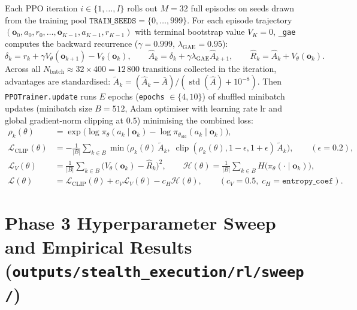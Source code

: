 \documentclass[11pt,a4paper]{article}
\newcommand{\code}[1]{\texttt{#1}}
\newcommand{\clip}{\operatorname{clip}}
\begin{document}
Each PPO iteration $i \in \{1,\dots,I\}$ rolls out $M = 32$ full episodes on seeds drawn from the
training pool $\code{TRAIN\_SEEDS} = \{0,\dots,999\}$. For each episode trajectory
$(\mathbf{o}_0, a_0, r_0, \dots, \mathbf{o}_{K-1}, a_{K-1}, r_{K-1})$ with terminal bootstrap value
$V_K = 0$, \code{\_gae} computes the backward recurrence ($\gamma = 0.999$, $\lambda_{\text{GAE}} = 0.95$):
\begin{equation}
  \delta_k = r_k + \gamma V_\theta(\mathbf{o}_{k+1}) - V_\theta(\mathbf{o}_k), \qquad
  \hat A_k = \delta_k + \gamma\lambda_{\text{GAE}} \hat A_{k+1}, \qquad
  \hat R_k = \hat A_k + V_\theta(\mathbf{o}_k).
\end{equation}
Across all $N_{\text{batch}} \approx 32 \times 400 = 12\,800$ transitions collected in the iteration,
advantages are standardised: $\tilde A_k = (\hat A_k - \bar A)/(\operatorname{std}(\hat A) + 10^{-8})$.
Then \code{PPOTrainer.update} runs $E$ epochs (\code{epochs} $\in \{4, 10\}$) of shuffled minibatch
updates (minibatch size $B = 512$, Adam optimiser with learning rate $\text{lr}$ and global gradient-norm
clipping at $0.5$) minimising the combined loss:
\begin{align}
  \rho_k(\theta) &= \exp\!\big(\log \pi_\theta(a_k \mid \mathbf{o}_k) - \log \pi_{\theta_{\text{old}}}(a_k \mid \mathbf{o}_k)\big), \\
  \mathcal{L}_{\text{CLIP}}(\theta) &= -\frac{1}{|B|}\sum_{k \in B}
    \min\!\Big(\rho_k(\theta)\,\tilde A_k,\; \clip(\rho_k(\theta), 1-\epsilon, 1+\epsilon)\,\tilde A_k\Big), \qquad (\epsilon = 0.2), \\
  \mathcal{L}_V(\theta) &= \frac{1}{|B|}\sum_{k \in B} \big(V_\theta(\mathbf{o}_k) - \hat R_k\big)^2, \qquad
  \mathcal{H}(\theta) = \frac{1}{|B|}\sum_{k \in B} H\big(\pi_\theta(\cdot \mid \mathbf{o}_k)\big), \\
  \mathcal{L}(\theta) &= \mathcal{L}_{\text{CLIP}}(\theta) + c_V \mathcal{L}_V(\theta) - c_H \mathcal{H}(\theta),
  \qquad (c_V = 0.5,\; c_H = \code{entropy\_coef}).
\end{align}

\section{Phase 3 Hyperparameter Sweep and Empirical Results (\code{outputs/stealth\_execution/rl/sweep/})}
\label{sec:rl_results}
\end{document}
